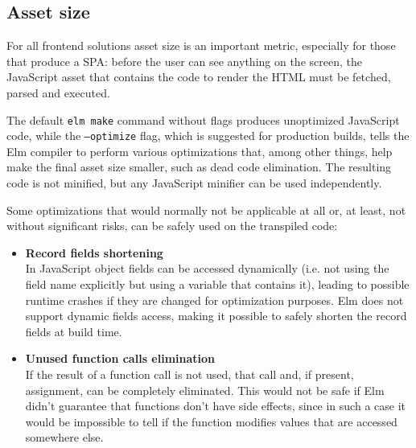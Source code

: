 \subsection{Asset size}
For all frontend solutions asset size is an important metric, especially for those that produce a SPA: before the user can see anything on the screen, the JavaScript asset that contains the code to render the HTML must be fetched, parsed and executed.

The default \texttt{elm make} command without flags produces unoptimized JavaScript code, while the \texttt{--optimize} flag, which is suggested for production builds, tells the Elm compiler to perform various optimizations that, among other things, help make the final asset size smaller, such as dead code elimination. The resulting code is not minified, but any JavaScript minifier can be used independently. \cite{noauthor_minification_nodate}

Some optimizations that would normally not be applicable at all or, at least, not without significant risks, can be safely used on the transpiled code:
\begin{itemize}
    \item \textbf{Record fields shortening}\\In JavaScript object fields can be accessed dynamically (i.e. not using the field name explicitly but using a variable that contains it), leading to possible runtime crashes if they are changed for optimization purposes. Elm does not support dynamic fields access, making it possible to safely shorten the record fields at build time.
    \item \textbf{Unused function calls elimination}\\If the result of a function call is not used, that call and, if present, assignment, can be completely eliminated. This would not be safe if Elm didn't guarantee that functions don't have side effects, since in such a case it would be impossible to tell if the function modifies values that are accessed somewhere else.
\end{itemize}
